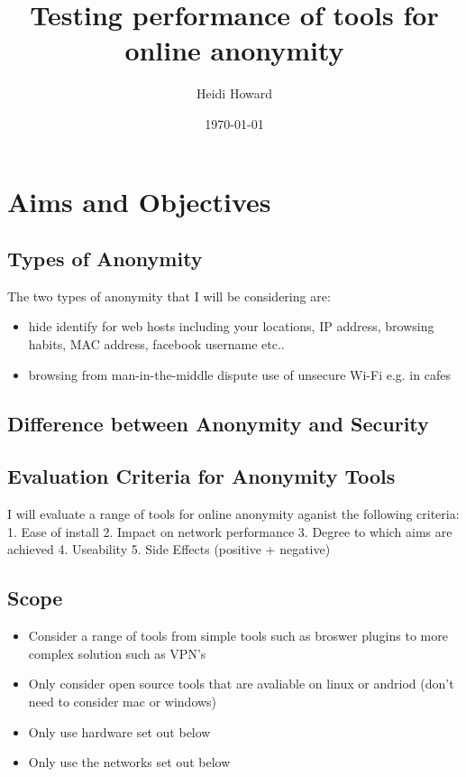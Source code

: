 \documentclass[12pt,a4paper,oneside]{article}
\begin{document}
\title{Testing performance of tools for online anonymity }
\author{Heidi Howard}
\date{\today}
\maketitle
\tableofcontents

\section{Aims and Objectives}

\subsection{Types of Anonymity}
The two types of anonymity that I will be considering are:
\begin{itemize}
\item hide identify for web hosts including your locations, IP address, browsing habits, MAC address, facebook username etc..
\item browsing from man-in-the-middle dispute use of unsecure Wi-Fi e.g. in cafes 
\end{itemize}

\subsection{Difference between Anonymity and Security}

\subsection{Evaluation Criteria for Anonymity Tools}
I will evaluate a range of tools for online anonymity aganist the following criteria:
	1. Ease of install
	2. Impact on network performance
	3. Degree to which aims are achieved 
	4. Useability
	5. Side Effects (positive + negative)


\subsection{Scope}
\begin{itemize}
\item Consider a range of tools from simple tools such as broswer plugins to more complex solution such as VPN's
\item Only consider open source tools that are avaliable on linux or andriod (don't need to consider mac or windows)
\item Only use hardware set out below
\item Only use the networks set out below
\end{itemize}
\end{document}
